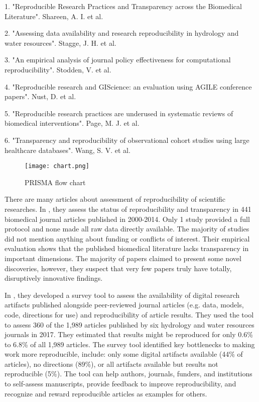 \documentclass[
10pt, %
a4paper, %
oneside, %
headinclude,footinclude, %
BCOR5mm, %
]{scrartcl}
\begin{document}
1. "Reproducible Research Practices and Transparency across the Biomedical Literature". Shareen, A. I. et al.

2. "Assessing data availability and research reproducibility in hydrology and water resources". Stagge, J. H. et al.

3. "An empirical analysis of journal policy effectiveness for computational reproducibility". Stodden, V. et al.

4. "Reproducible research and GIScience: an evaluation using AGILE conference papers". Nust, D. et al.

5. "Reproducible research practices are underused in systematic reviews of biomedical interventions". Page, M. J. et al.

6. "Transparency and reproducibility of observational cohort studies using large healthcare databases". Wang, S. V. et al.

\begin{figure}[h]
    \centering
    \texttt{[image: chart.png]}
    \caption{PRISMA flow chart }
    \label{fig:chart}
\end{figure}
\newpage

There are many articles about assessment of reproducibility of scientific researches.
In \cite{iqbal2016reproducible}, they assess the status of reproducibility and transparency in 441 biomedical journal articles published in 2000-2014. Only 1 study provided a full protocol and none made all raw data directly available. The majority of studies did not mention anything about funding or conflicts of interest. Their empirical evaluation shows that the published biomedical literature lacks transparency in important dimensions. The majority of papers claimed to present some novel discoveries, however, they suspect that very few papers truly have totally, disruptively innovative findings.

In \cite{Stagge2019Assessing}, they developed a survey tool to assess the availability of digital research artifacts published alongside peer-reviewed journal articles (e.g. data, models, code, directions for use) and reproducibility of article results.
They used the tool to assess 360 of the 1,989 articles published by six hydrology and water resources journals in 2017.
They estimated that results might be reproduced for only 0.6\% to 6.8\% of all 1,989 articles.
The survey tool identified key bottlenecks to making work more reproducible, include: only some digital artifacts available (44\% of articles), no directions (89\%), or all artifacts available but results not reproducible (5\%).
The tool can help authors, journals, funders, and institutions to self-assess manuscripts, provide feedback to improve reproducibility, and recognize and reward reproducible articles as examples for others.
\end{document}
